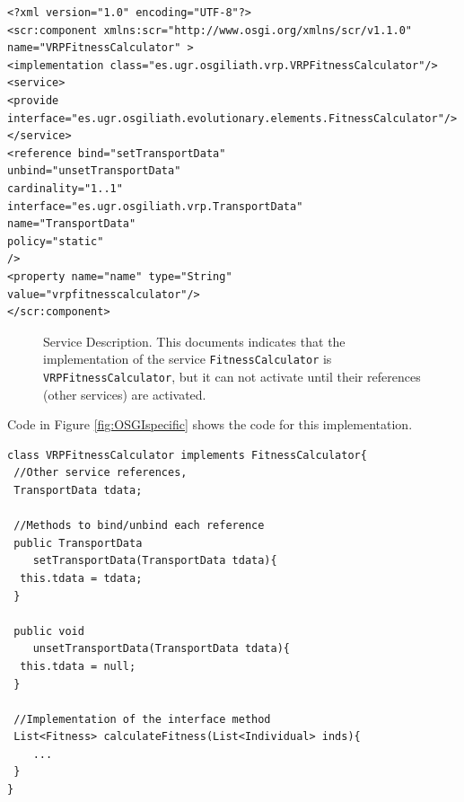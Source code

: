 \newsavebox{\mintedboxOSGIDS}
\begin{lrbox}{\mintedboxOSGIDS}
\begin{minipage}{10cm}
\begin{verbatim}
<?xml version="1.0" encoding="UTF-8"?>
<scr:component xmlns:scr="http://www.osgi.org/xmlns/scr/v1.1.0"
name="VRPFitnessCalculator" >
<implementation class="es.ugr.osgiliath.vrp.VRPFitnessCalculator"/>
<service>
<provide 
interface="es.ugr.osgiliath.evolutionary.elements.FitnessCalculator"/>
</service>
<reference bind="setTransportData"
unbind="unsetTransportData"
cardinality="1..1"
interface="es.ugr.osgiliath.vrp.TransportData"
name="TransportData"
policy="static"
/>
<property name="name" type="String"
value="vrpfitnesscalculator"/>
</scr:component>
\end{verbatim}
\end{minipage}
\end{lrbox}


\begin{figure}
\usebox{\mintedboxOSGIDS}
\caption{Service Description. This documents indicates that the implementation of the service \texttt{FitnessCalculator} is \texttt{VRPFitnessCalculator}, but it can not activate until their references (other services) are activated.}
\label{fig:ds} 
\end{figure}

Code in Figure \ref{fig:OSGIspecific} shows the code for this implementation.

\newsavebox{\mintedboxOSGIspecific}
\begin{lrbox}{\mintedboxOSGIspecific}
\begin{minipage}{10cm}
\begin{verbatim}
class VRPFitnessCalculator implements FitnessCalculator{
 //Other service references,
 TransportData tdata;
 
 //Methods to bind/unbind each reference
 public TransportData 
    setTransportData(TransportData tdata){
  this.tdata = tdata;
 }
	
 public void 
    unsetTransportData(TransportData tdata){
  this.tdata = null;
 }

 //Implementation of the interface method
 List<Fitness> calculateFitness(List<Individual> inds){
 	...
 }
}
\end{verbatim}
\end{minipage}
\end{lrbox}

